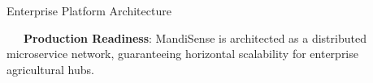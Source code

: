 \documentclass{beamer}
\begin{document}
\begin{frame}{Enterprise Platform Architecture}
\vspace{0.15cm}
\begin{tcolorbox}[enhanced, colback=primaryblue!4, colframe=primaryblue!30, boxrule=0.35pt,
  arc=3.5pt, width=0.98\textwidth, left=4pt, right=4pt, top=2.5pt, bottom=2.5pt, boxsep=0pt,
  halign=center, shadow={0.5pt}{-0.5pt}{0pt}{black!8}]
    \fontsize{5.5pt}{6.5pt}\selectfont
    \textcolor{primaryDark}{~~~\textbf{Production Readiness}: MandiSense is architected as a distributed microservice network, guaranteeing horizontal scalability for enterprise agricultural hubs.}
\end{tcolorbox}
\end{frame}

\end{document}
